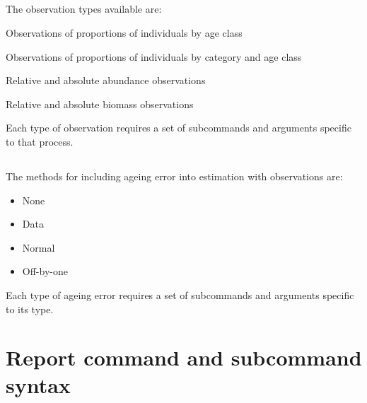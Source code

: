 \subsection{}

The observation types available are:

\begin{description}
  \item Observations of proportions of individuals by age class
  \item Observations of proportions of individuals by category and age class
  \item Relative and absolute abundance observations
  \item Relative and absolute biomass observations
\end{description}

Each type of observation requires a set of subcommands and arguments specific to that process.



\subsection{}


\subsection{}

The methods for including ageing error into estimation with observations are:

\begin{itemize}
	\item None
	\item Data
	\item Normal
	\item Off-by-one
\end{itemize}

Each type of ageing error requires a set of subcommands and arguments specific to its type.



\subsection{}


\section{Report command and subcommand syntax\label{sec:report-syntax}}
